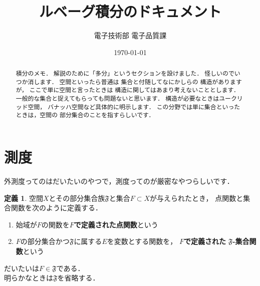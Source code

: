 \documentclass[dvipdfmx,a4paper,12pt]{jsarticle}
\title{ルベーグ積分のドキュメント}
\author{電子技術部 電子品質課}
\date{\today}
\theoremstyle{definition}
\newtheorem{definition}[theorem]{定義}
\begin{document}

\begin{abstract}
    積分のメモ．
    解説のために「多分」というセクションを設けました．
    怪しいのでいつか消します．
    空間といったら普通は
    集合と付随してなにかしらの
    構造がありますが，
    ここで単に空間と言ったときは
    構造に関してはあまり考えないこととします．
    一般的な集合と捉えてもらっても問題ないと思います．
    構造が必要なときはユークリッド空間，
    バナッハ空間など具体的に明示します．
    この分野では単に集合といったときは，空間の
    部分集合のことを指すらしいです．
\end{abstract}

\section{測度}
外測度ってのはだいたいのやつで，測度ってのが厳密なやつらしいです．

\begin{definition}\label{def:syuugoukannsuu}
    空間$X$とその部分集合族$\mathfrak{F}$と集合$F\subset X$が与えられたとき，
    点関数と集合関数を次のように定義する．
    \begin{enumerate}
        \item 始域が$F$の関数を$F$\textbf{で定義された点関数}という
        \item $F$の部分集合かつ$\mathfrak{F}$に属する$E$を変数とする関数を，
        $F$\textbf{で定義された}
        $\mathfrak{F}$\textbf{-集合関数}という
    \end{enumerate}
\end{definition}
だいたいは$F\in \mathfrak{F}$である．\\
明らかなときは$\mathfrak{F}$を省略する．
\end{document}
